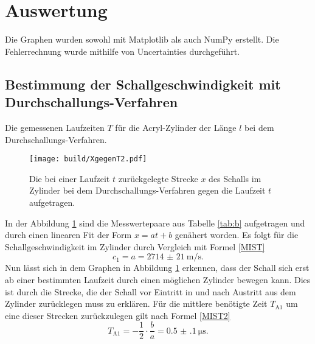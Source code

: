 \section{Auswertung}
\label{sec:Auswertung}


Die Graphen wurden sowohl mit Matplotlib \cite{matplotlib} als auch NumPy \cite{numpy} erstellt. Die
Fehlerrechnung wurde mithilfe von Uncertainties \cite{uncertainties} durchgeführt.

\subsection{Bestimmung der Schallgeschwindigkeit mit Durchschallungs-Verfahren}
\begin{table}
	\centering
	\caption{Die gemessenen Laufzeiten $T$ für die Acryl-Zylinder der Länge $l$ bei dem Durchschallungs-Verfahren.}
	
\end{table}
\begin{figure}
	\centering
	\caption{Die bei einer Laufzeit $t$ zurückgelegte Strecke $x$ des Schalls im Zylinder bei dem Durchschallungs-Verfahren gegen die Laufzeit $t$ aufgetragen.}
	\texttt{[image: build/XgegenT2.pdf]}
	\label{fig:XgegenT2}
\end{figure}
In der Abbildung \ref{fig:XgegenT2} sind die Messwertepaare aus Tabelle \ref{tab:b} aufgetragen und durch einen linearen Fit der Form $x=a t + b$ genähert worden.
Es folgt für die Schallgeschwindigkeit im Zylinder durch Vergleich mit Formel \eqref{MIST}
\begin{equation}
	c_1=a=\SI{2714(21)}{\meter\per\second}\text{.}
\end{equation}
Nun lässt sich in dem Graphen in Abbildung \ref{fig:XgegenT2} erkennen, dass der Schall sich erst ab einer bestimmten Laufzeit durch einen möglichen Zylinder bewegen kann. Dies ist durch die Strecke, die der Schall vor Eintritt in und nach Austritt aus dem Zylinder zurücklegen muss zu erklären. Für die mittlere benötigte Zeit $T_{\text{A}1}$ um eine dieser Strecken zurückzulegen gilt nach Formel \eqref{MIST2}
\begin{equation}
	T_{\text{A}1}=-\frac{1}{2} \cdot \frac{b}{a}=\SI{0.5(1)}{\micro\second}\text{.}
\end{equation}



